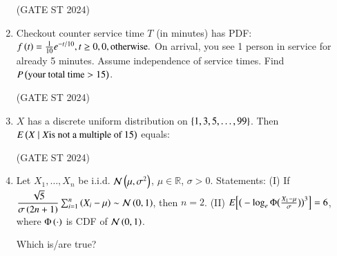 \documentclass[journal,12pt,onecolumn]{IEEEtran}
\theoremstyle{remark}
\begin{document}
\begin{enumerate}
\begin{enumerate}
\end{enumerate}
\hfill (GATE ST 2024)
\item
Checkout counter service time $T$ (in minutes) has PDF:
$
f\left(t\right) = 
\frac{1}{10} e^{-t/10},  t \ge 0, \\
0,  \text{otherwise}.
$
On arrival, you see 1 person in service for already 5 minutes. Assume independence of service times.  
Find $P\left(\text{your total time} > 15\right)$.

\begin{enumerate}
\end{enumerate}
\hfill (GATE ST 2024)
\item
$X$ has a discrete uniform distribution on $\left\{1,3,5,\dots,99\right\}$. Then
$E\left(X \mid X  \text{is not a multiple of } 15\right)$ equals:

\begin{enumerate}
\end{enumerate}
\hfill (GATE ST 2024)
\item
Let $X_1,\dots,X_n$ be i.i.d. $\mathcal{N}\left(\mu,\sigma^2\right)$, $\mu\in\mathbb{R}$, $\sigma>0$.  
Statements:
(I) If $\dfrac{\sqrt{5}}{\sigma\left(2n+1\right)}\sum_{i=1}^n \left(X_i-\mu\right) \sim \mathcal{N}\left(0,1\right)$, then $n=2$.  
(II) $E\!{}\left[ \big(-\log_e \Phi\big(\frac{X_1-\mu}{\sigma}\big)\big)^3 \right] = 6$, where $\Phi\left(\cdot\right)$ is CDF of $\mathcal{N}\left(0,1\right)$.

Which is/are true?


\end{enumerate}
\end{document}
